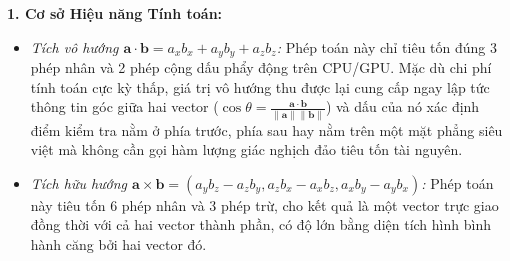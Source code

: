 \textbf{1. Cơ sở Hiệu năng Tính toán:}
\begin{itemize}
    \item \textit{Tích vô hướng $\mathbf{a} \cdot \mathbf{b} = a_x b_x + a_y b_y + a_z b_z$:} Phép toán này chỉ tiêu tốn đúng 3 phép nhân và 2 phép cộng dấu phẩy động trên CPU/GPU. Mặc dù chi phí tính toán cực kỳ thấp, giá trị vô hướng thu được lại cung cấp ngay lập tức thông tin góc giữa hai vector ($\cos\theta = \frac{\mathbf{a} \cdot \mathbf{b}}{\|\mathbf{a}\| \|\mathbf{b}\|}$) và dấu của nó xác định điểm kiểm tra nằm ở phía trước, phía sau hay nằm trên một mặt phẳng siêu việt mà không cần gọi hàm lượng giác nghịch đảo tiêu tốn tài nguyên.
    \item \textit{Tích hữu hướng $\mathbf{a} \times \mathbf{b} = (a_y b_z - a_z b_y, a_z b_x - a_x b_z, a_x b_y - a_y b_x)$:} Phép toán này tiêu tốn 6 phép nhân và 3 phép trừ, cho kết quả là một vector trực giao đồng thời với cả hai vector thành phần, có độ lớn bằng diện tích hình bình hành căng bởi hai vector đó.
\end{itemize}

